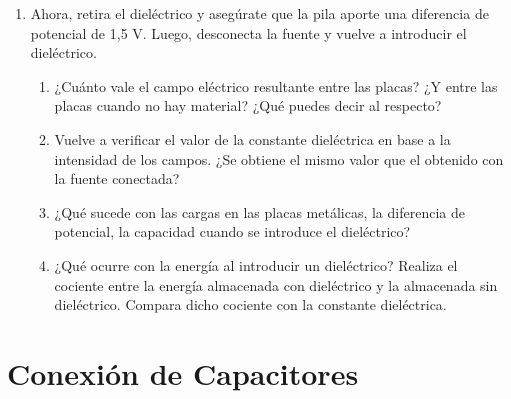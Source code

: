 \documentclass[12pt]{report}
\begin{document}
\begin{enumerate}
\begin{enumerate}
    \end{enumerate}
    \item Ahora, retira el dieléctrico y asegúrate que la pila aporte una diferencia de potencial de 1,5 V. Luego, desconecta la fuente y vuelve a introducir el dieléctrico.
    \begin{enumerate}
        \item ¿Cuánto vale el campo eléctrico resultante entre las placas? ¿Y entre las placas cuando no hay material? ¿Qué puedes decir al respecto?
        \item Vuelve a verificar el valor de la constante dieléctrica en base a la intensidad de los campos. ¿Se obtiene el mismo valor que el obtenido con la fuente conectada?
        \item ¿Qué sucede con las cargas en las placas metálicas, la diferencia de potencial, la capacidad cuando se introduce el dieléctrico?
        \item ¿Qué ocurre con la energía al introducir un dieléctrico? Realiza el cociente entre la energía almacenada con dieléctrico y la almacenada sin dieléctrico. Compara dicho cociente con la constante dieléctrica.
    \end{enumerate}
\end{enumerate}

\newpage

\section{Conexión de Capacitores}
\end{document}
